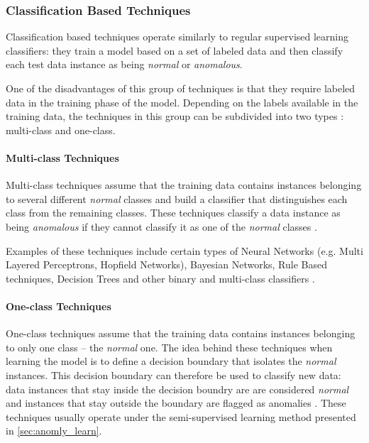 \subsubsection{Classification Based Techniques}

Classification based techniques operate similarly to regular supervised learning classifiers: they train a model based on a set of labeled data and then classify each test data instance as being \textit{normal} or \textit{anomalous}.

One of the disadvantages of this group of techniques is that they require labeled data in the training phase of the model. Depending on the labels available in the training data, the techniques in this group can be subdivided into two types \cite{Kandhari2009}: multi-class and one-class.


\paragraph{Multi-class Techniques}\mbox{}

Multi-class techniques assume that the training data contains instances belonging to several different \textit{normal} classes and build a classifier that distinguishes each class from the remaining classes. These techniques classify a data instance as being \textit{anomalous} if they cannot classify it as one of the \textit{normal} classes \cite{Kandhari2009}.

Examples of these techniques include certain types of Neural Networks (e.g. Multi Layered Perceptrons, Hopfield Networks), Bayesian Networks, Rule Based techniques, Decision Trees and other binary and multi-class classifiers \cite{Kandhari2009}.

\paragraph{One-class Techniques}\mbox{}

One-class techniques assume that the training data contains instances belonging to only one class -- the \textit{normal} one. The idea behind these techniques when learning the model is to define a decision boundary that isolates the \textit{normal} instances.
This decision boundary can therefore be used to classify new data: data instances that stay inside the decision boundry are are considered \textit{normal} and instances that stay outside the boundary are flagged as anomalies \cite{Kandhari2009}.
These techniques usually operate under the semi-supervised learning method presented in \ref{sec:anomly_learn}.

